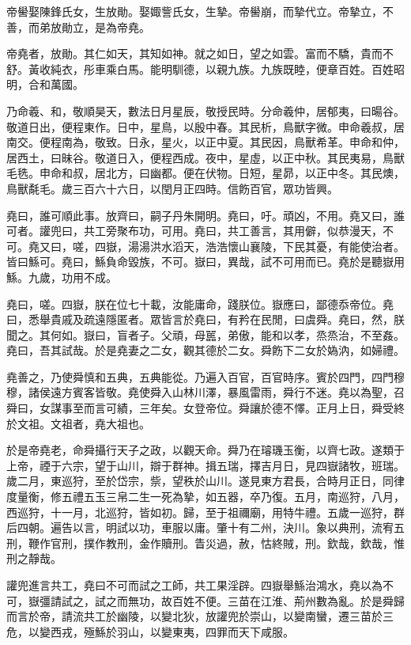 \documentclass[twocolumn]{cvertbook}
\begin{document}
帝嚳娶陳鋒氏女，生放勛。娶娵訾氏女，生摯。帝嚳崩，而摯代立。帝摯立，不善，而弟放勛立，是為帝堯。

帝堯者，放勛。其仁如天，其知如神。就之如日，望之如雲。富而不驕，貴而不舒。黃收純衣，彤車乘白馬。能明馴德，以親九族。九族既睦，便章百姓。百姓昭明，合和萬國。

乃命羲、和，敬順昊天，數法日月星辰，敬授民時。分命羲仲，居郁夷，曰暘谷。敬道日出，便程東作。日中，星鳥，以殷中春。其民析，鳥獸字微。申命羲叔，居南交。便程南為，敬致。日永，星火，以正中夏。其民因，鳥獸希革。申命和仲，居西土，曰昧谷。敬道日入，便程西成。夜中，星虛，以正中秋。其民夷易，鳥獸毛毨。申命和叔，居北方，曰幽都。便在伏物。日短，星昴，以正中冬。其民燠，鳥獸氄毛。歲三百六十六日，以閏月正四時。信飭百官，眾功皆興。

堯曰，誰可順此事。放齊曰，嗣子丹朱開明。堯曰，吁。頑凶，不用。堯又曰，誰可者。讙兜曰，共工旁聚布功，可用。堯曰，共工善言，其用僻，似恭漫天，不可。堯又曰，嗟，四嶽，湯湯洪水滔天，浩浩懷山襄陵，下民其憂，有能使治者。皆曰鯀可。堯曰，鯀負命毀族，不可。嶽曰，異哉，試不可用而已。堯於是聽嶽用鯀。九歲，功用不成。

堯曰，嗟。四嶽，朕在位七十載，汝能庸命，踐朕位。嶽應曰，鄙德忝帝位。堯曰，悉舉貴戚及疏遠隱匿者。眾皆言於堯曰，有矜在民閒，曰虞舜。堯曰，然，朕聞之。其何如。嶽曰，盲者子。父頑，母嚚，弟傲，能和以孝，烝烝治，不至姦。堯曰，吾其試哉。於是堯妻之二女，觀其德於二女。舜飭下二女於媯汭，如婦禮。

堯善之，乃使舜慎和五典，五典能從。乃遍入百官，百官時序。賓於四門，四門穆穆，諸侯遠方賓客皆敬。堯使舜入山林川澤，暴風雷雨，舜行不迷。堯以為聖，召舜曰，女謀事至而言可績，三年矣。女登帝位。舜讓於德不懌。正月上日，舜受終於文祖。文祖者，堯大祖也。

於是帝堯老，命舜攝行天子之政，以觀天命。舜乃在璿璣玉衡，以齊七政。遂類于上帝，禋于六宗，望于山川，辯于群神。揖五瑞，擇吉月日，見四嶽諸牧，班瑞。歲二月，東巡狩，至於岱宗，祡，望秩於山川。遂見東方君長，合時月正日，同律度量衡，修五禮五玉三帛二生一死為摯，如五器，卒乃復。五月，南巡狩，八月，西巡狩，十一月，北巡狩，皆如初。歸，至于祖禰廟，用特牛禮。五歲一巡狩，群后四朝。遍告以言，明試以功，車服以庸。肇十有二州，決川。象以典刑，流宥五刑，鞭作官刑，撲作教刑，金作贖刑。眚災過，赦，怙終賊，刑。欽哉，欽哉，惟刑之靜哉。

讙兜進言共工，堯曰不可而試之工師，共工果淫辟。四嶽舉鯀治鴻水，堯以為不可，嶽彊請試之，試之而無功，故百姓不便。三苗在江淮、荊州數為亂。於是舜歸而言於帝，請流共工於幽陵，以變北狄，放讙兜於崇山，以變南蠻，遷三苗於三危，以變西戎，殛鯀於羽山，以變東夷，四罪而天下咸服。
\end{document}
